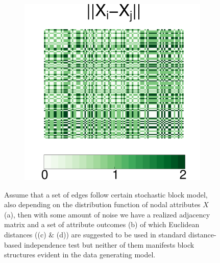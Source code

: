 \documentclass[12pt]{article}
\theoremstyle{definition}
\begin{document}
\begin{figure}[H]
\begin{subfigure}[b]{0.23\textwidth}
			\caption{}
		\label{fig:c}
	\end{subfigure}
		\begin{subfigure}[b]{0.23\textwidth}
			\includegraphics[width=\textwidth]{../../Figure/distX.pdf}
				\caption{}
			\label{fig:d}
		\end{subfigure}
	\caption{Assume that a set of edges follow certain stochastic block model, also depending on the distribution function of nodal attributes $X$ (a), then with some amount of noise we have a realized adjacency matrix and a set of attribute outcomes (b) of which Euclidean distances ((c) $\&$ (d)) are suggested to be used in standard distance-based independence test but neither of them manifests block structures evident in the data generating model.}
	\label{fig:matrics}
\end{figure}
\end{document}
